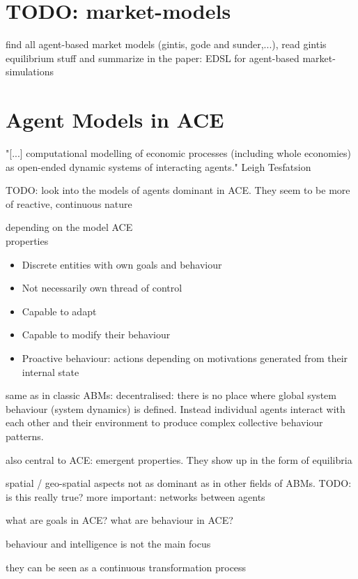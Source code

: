 \section{TODO: market-models}
find all agent-based market models (gintis, gode and sunder,...), read gintis equilibrium stuff and summarize in the paper: EDSL for agent-based market-simulations

\section{Agent Models in ACE}
"[...] computational modelling of economic processes (including whole economies) as open-ended dynamic systems of interacting agents." Leigh Tesfatsion

TODO: look into the models of agents dominant in ACE. They seem to be more of reactive, continuous nature

depending on the model ACE \\

properties
\begin{itemize}
\item Discrete entities with own goals and behaviour
\item Not necessarily own thread of control
\item Capable to adapt 
\item Capable to modify their behaviour
\item Proactive behaviour: actions depending on motivations generated from their internal state
\end{itemize}

same as in classic ABMs: decentralised: there is no place where global system behaviour (system dynamics) is defined. Instead individual agents interact with each other and their environment to produce complex collective behaviour patterns.

also central to ACE: emergent properties. They show up in the form of equilibria

spatial / geo-spatial aspects not as dominant as in other fields of ABMs. TODO: is this really true?
more important: networks between agents

what are goals in ACE?
what are behaviour in ACE?

behaviour and intelligence is not the main focus

they can be seen as a continuous transformation process